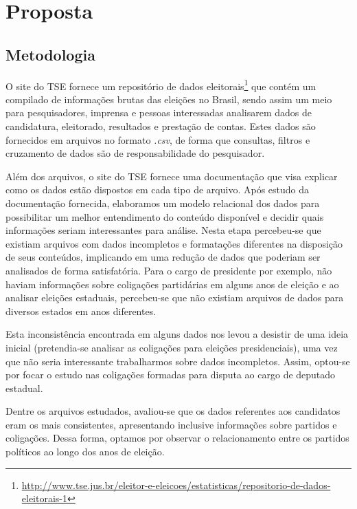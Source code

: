 \chapter{Proposta}
\label{proposta}

\section{Metodologia}
\label{proposta__metodologia}

O site do \gls{TSE} fornece um repositório de dados eleitorais\footnote{\url{http://www.tse.jus.br/eleitor-e-eleicoes/estatisticas/repositorio-de-dados-eleitorais-1}} que contém um compilado de informações brutas das eleições no Brasil, sendo assim um meio para pesquisadores, imprensa e pessoas interessadas analisarem dados de candidatura, eleitorado, resultados e prestação de contas. Estes dados são fornecidos em arquivos no formato \emph{.csv}, de forma que consultas, filtros e cruzamento de dados são de responsabilidade do pesquisador.

Além dos arquivos, o site do \gls{TSE} fornece uma documentação que visa explicar como os dados estão dispostos em cada tipo de arquivo. Após estudo da documentação fornecida, elaboramos um modelo relacional dos dados para possibilitar um melhor entendimento do conteúdo disponível e decidir quais informações seriam interessantes para análise. Nesta etapa percebeu-se que existiam arquivos com dados incompletos e formatações diferentes na disposição de seus conteúdos, implicando em uma redução de dados que poderiam ser analisados de forma satisfatória.  Para o cargo de presidente por exemplo, não haviam informações sobre coligações partidárias em alguns anos de eleição e ao analisar eleições estaduais, percebeu-se que não existiam arquivos de dados para diversos estados em anos diferentes.

Esta inconsistência encontrada em alguns dados nos levou a desistir de uma ideia inicial (pretendia-se analisar as coligações para eleições presidenciais), uma vez que não seria interessante trabalharmos sobre dados incompletos. Assim, optou-se por focar o estudo nas coligações formadas para disputa ao cargo de deputado estadual. 

Dentre os arquivos estudados, avaliou-se que os dados referentes aos candidatos eram os mais consistentes, apresentando inclusive informações sobre partidos e coligações. Dessa forma, optamos por observar o relacionamento entre os partidos políticos ao longo dos anos de eleição. 


